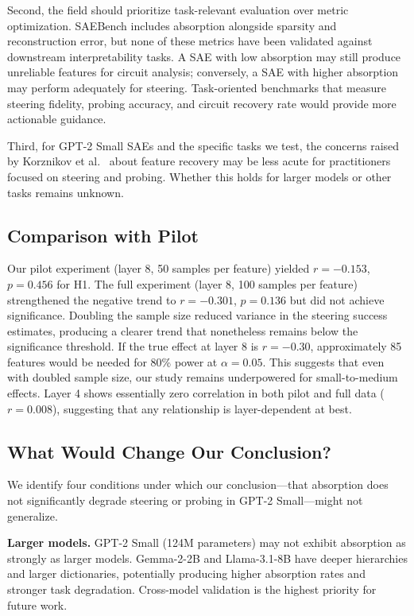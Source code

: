\documentclass{article}
\begin{document}
Second, the field should prioritize task-relevant evaluation over metric optimization. SAEBench includes absorption alongside sparsity and reconstruction error, but none of these metrics have been validated against downstream interpretability tasks. A SAE with low absorption may still produce unreliable features for circuit analysis; conversely, a SAE with higher absorption may perform adequately for steering. Task-oriented benchmarks that measure steering fidelity, probing accuracy, and circuit recovery rate would provide more actionable guidance.

Third, for GPT-2 Small SAEs and the specific tasks we test, the concerns raised by Korznikov et al.~\cite{korznikov2025ort} about feature recovery may be less acute for practitioners focused on steering and probing. Whether this holds for larger models or other tasks remains unknown.

\subsection{Comparison with Pilot}

Our pilot experiment (layer 8, 50 samples per feature) yielded $r = -0.153$, $p = 0.456$ for H1. The full experiment (layer 8, 100 samples per feature) strengthened the negative trend to $r = -0.301$, $p = 0.136$ but did not achieve significance. Doubling the sample size reduced variance in the steering success estimates, producing a clearer trend that nonetheless remains below the significance threshold. If the true effect at layer 8 is $r = -0.30$, approximately 85 features would be needed for 80\% power at $\alpha = 0.05$. This suggests that even with doubled sample size, our study remains underpowered for small-to-medium effects. Layer 4 shows essentially zero correlation in both pilot and full data ($r = 0.008$), suggesting that any relationship is layer-dependent at best.

\subsection{What Would Change Our Conclusion?}

We identify four conditions under which our conclusion---that absorption does not significantly degrade steering or probing in GPT-2 Small---might not generalize.

\textbf{Larger models.} GPT-2 Small (124M parameters) may not exhibit absorption as strongly as larger models. Gemma-2-2B and Llama-3.1-8B have deeper hierarchies and larger dictionaries, potentially producing higher absorption rates and stronger task degradation. Cross-model validation is the highest priority for future work.
\end{document}
